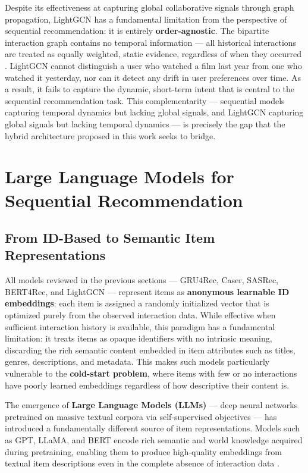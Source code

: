 \documentclass[12pt,a4paper]{report}
\newcommand{\parencite}[1]{\citep{#1}}
\begin{document}
Despite its effectiveness at capturing global collaborative signals
through graph propagation, LightGCN has a fundamental limitation
from the perspective of sequential recommendation: it is entirely
\textbf{order-agnostic}. The bipartite interaction graph contains
no temporal information --- all historical interactions are treated
as equally weighted, static evidence, regardless of when they
occurred \parencite{he2020lightgcn}. LightGCN cannot distinguish
a user who watched a film last year from one who watched it
yesterday, nor can it detect any drift in user preferences over
time. As a result, it fails to capture the dynamic, short-term
intent that is central to the sequential recommendation task.
This complementarity --- sequential models capturing temporal
dynamics but lacking global signals, and LightGCN capturing global
signals but lacking temporal dynamics --- is precisely the gap that
the hybrid architecture proposed in this work seeks to bridge.

\section{Large Language Models for Sequential Recommendation}

\subsection{From ID-Based to Semantic Item Representations}

All models reviewed in the previous sections --- GRU4Rec, Caser,
SASRec, BERT4Rec, and LightGCN --- represent items as
\textbf{anonymous learnable ID embeddings}: each item is assigned
a randomly initialized vector that is optimized purely from the
observed interaction data. While effective when sufficient
interaction history is available, this paradigm has a fundamental
limitation: it treats items as opaque identifiers with no intrinsic
meaning, discarding the rich semantic content embedded in item
attributes such as titles, genres, descriptions, and metadata.
This makes such models particularly vulnerable to the
\textbf{cold-start problem}, where items with few or no interactions
have poorly learned embeddings regardless of how descriptive their
content is.

The emergence of \textbf{Large Language Models (LLMs)} --- deep
neural networks pretrained on massive textual corpora via
self-supervised objectives --- has introduced a fundamentally
different source of item representations. Models such as GPT,
LLaMA, and BERT encode rich semantic and world knowledge acquired
during pretraining, enabling them to produce high-quality
embeddings from textual item descriptions even in the complete
absence of interaction data \parencite{wu2023survey}.
\end{document}
